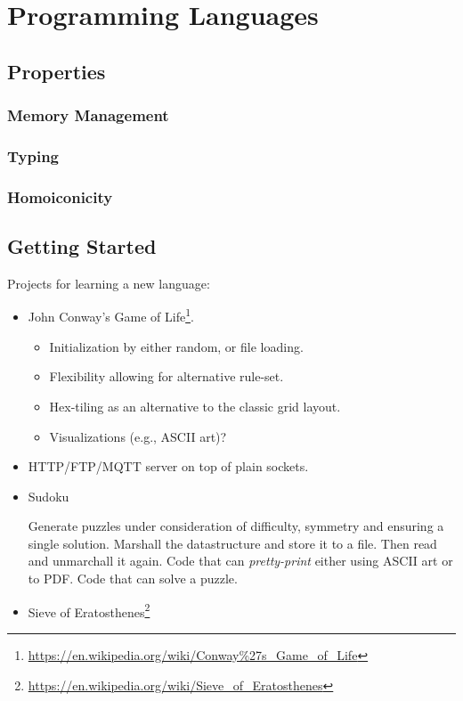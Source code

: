 \chapter{Programming Languages}


\section{Properties}

\subsection{Memory Management}

\subsection{Typing}

\subsection{Homoiconicity}

\section{Getting Started}

Projects for learning a new language:
\begin{itemize}
  \item John Conway's Game of Life\footnote{\url{https://en.wikipedia.org/wiki/Conway\%27s_Game_of_Life}}\cite{Gardener1970MathematicalGT}.
    \begin{itemize}
      \item Initialization by either random, or file loading.
      \item Flexibility allowing for alternative rule-set.
      \item Hex-tiling as an alternative to the classic grid layout.
      \item Visualizations (e.g., ASCII art)?
    \end{itemize}
  \item HTTP/FTP/MQTT server on top of plain sockets.
  \item Sudoku
    \begin{itemize}
       Generate puzzles under consideration of difficulty, symmetry and ensuring a single solution.
       Marshall the datastructure and store it to a file. Then read and unmarchall it again.
       Code that can \textsl{pretty-print} either using ASCII art or to PDF.
       Code that can solve a puzzle.
    \end{itemize}
  \item Sieve of Eratosthenes\footnote{\url{https://en.wikipedia.org/wiki/Sieve_of_Eratosthenes}}
\end{itemize}










